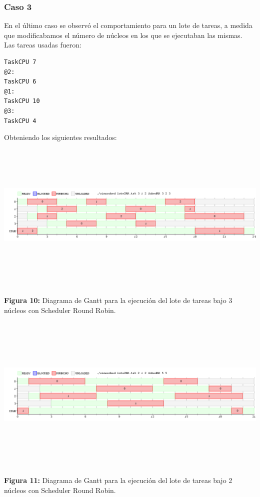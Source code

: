 \documentclass[a4paper]{article}
\begin{document}
 \bigskip
 
 \subsubsection*{Caso 3}
 
 En el último caso se observó el comportamiento para un lote  de tareas, a medida que modificabamos el número de núcleos en los que se ejecutaban las mismas.\\
 
 Las tareas usadas fueron:
 \begin{codesnippet}
	\begin{verbatim}
TaskCPU 7
@2:
TaskCPU 6
@1:
TaskCPU 10
@3:
TaskCPU 4
	\end{verbatim}
	\end{codesnippet}

	
	Obteniendo los siguientes resultados:\\

  \includegraphics[width=\textwidth,height=3.0in,keepaspectratio]{imagenes/ej4/eje4.png} \\
\begin {flushleft}
\textbf{Figura 10:} Diagrama de Gantt para la ejecuci\'on del lote de tareas bajo 3 n\'ucleos con Scheduler Round Robin.
\end{flushleft}

\newpage

 \includegraphics[width=\textwidth,height=3.0in,keepaspectratio]{imagenes/ej4/eje6.png} \\
\begin {flushleft}
\textbf{Figura 11:} Diagrama de Gantt para la ejecuci\'on del lote de tareas bajo 2 n\'ucleos con Scheduler Round Robin.
\end{flushleft}
 
\end{document}
